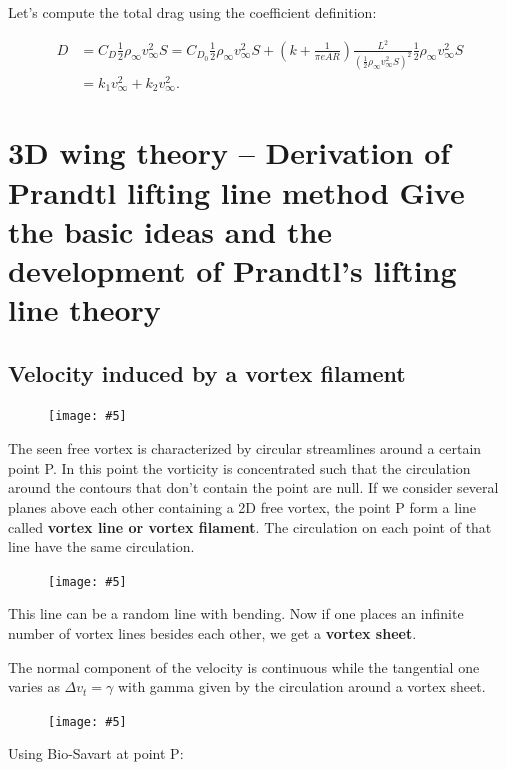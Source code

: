 \documentclass[british,french,11pt, a4paper, openany]{article}
\newcommand{\wrapfig}[6]{%
	\begin{figure}%
		\vspace{-5mm}%
		\texttt{[image: \#5]}%
		\captionof{figure}{}%
		\label{#6}%
	\end{figure}%
}
\begin{document}
Let's compute the total drag using the coefficient definition:

\begin{equation}
\begin{aligned}
D &= C_D \frac{1}{2} \rho _\infty v_\infty ^2 S = C_{D_0} \frac{1}{2} \rho _\infty v_\infty ^2 S + \left(k +\frac{1}{\pi e AR} \right)\frac{L^2}{( \frac{1}{2} \rho _\infty v_\infty ^2 S)^2} \frac{1}{2} \rho _\infty v_\infty ^2 S \\
&= k_1 v_\infty ^2 + k_2 v_\infty^2.
\end{aligned}
\label{eq:3.7}
\end{equation}



\section{3D wing theory – Derivation of Prandtl lifting line method
	Give the basic ideas and the development of Prandtl’s lifting line theory}

\subsection{Velocity induced by a vortex filament}
\wrapfig{6}{l}{7}{0.12}{ch3/11}{fig:3.11}
The seen free vortex is characterized by circular streamlines around a certain point P. In this point the vorticity is concentrated such that the circulation around the contours that don't contain the point are null. If we consider several planes above each other containing a 2D free vortex, the point P form a line called \textbf{vortex line or vortex filament}. The circulation on each point of that line have the same circulation.

\wrapfig{6}{l}{6.5}{0.06}{ch3/13}{fig:3.13}
This line can be a random line with bending. Now if one places an infinite number of vortex lines besides each other, we get a \textbf{vortex sheet}.

The normal component of the velocity is continuous while the tangential one varies as $ \Delta v_t = \gamma $ with gamma given by the circulation around a vortex sheet.

\wrapfig{10}{l}{5}{0.1}{ch3/14}{fig:3.14}
Using Bio-Savart at point P:
\end{document}
